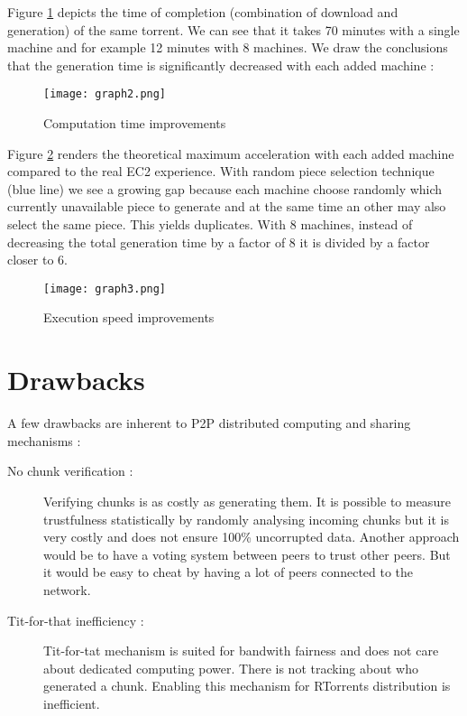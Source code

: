 \documentclass[a4paper]{article}
\begin{document}
{Figure \ref{graph2} depicts the time of completion (combination of download and generation) of the same torrent. We can see that it takes 70 minutes with a single machine and for example 12 minutes with 8 machines. We draw the conclusions that the generation time is significantly decreased with each added machine :

\vspace{3mm}
\begin{figure}[H]
  \centering
    \texttt{[image: graph2.png]}
    \caption{Computation time improvements}
    \label{graph2}
\end{figure}
\vspace{2mm}

Figure \ref{graph3} renders the theoretical maximum acceleration with each added machine compared to the real EC2 experience. With random piece selection technique (blue line) we see a growing gap because each machine choose randomly which currently unavailable piece to generate and at the same time an other may also select the same piece. This yields duplicates. With 8 machines, instead of decreasing the total generation time by a factor of 8 it is divided by a factor closer to 6.

\vspace{3mm}
\begin{figure}[H]
  \centering
    \texttt{[image: graph3.png]}
    \caption{Execution speed improvements}
    \label{graph3}
\end{figure}
\vspace{2mm}


\section{Drawbacks}

A few drawbacks are inherent to P2P distributed computing and  sharing mechanisms :\\

\begin{description}
	\item [No chunk verification : ] Verifying chunks is as costly as generating them. It is possible to measure trustfulness statistically by randomly analysing incoming chunks but it is very costly and does not ensure 100\% uncorrupted data. Another approach would be to have a voting system between peers to trust other peers. But it would be easy to cheat by having a lot of peers connected to the network.\\
	\item[Tit-for-that inefficiency : ] Tit-for-tat mechanism is suited for bandwith fairness and does not care about dedicated computing power. There is not tracking about who generated a chunk. Enabling this mechanism for RTorrents distribution is inefficient.
\end{description}

}
\end{document}
